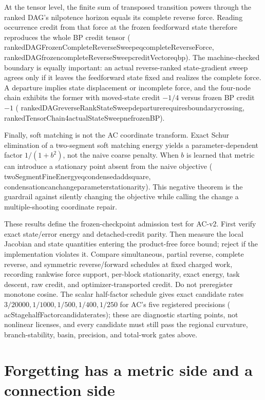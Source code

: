 \documentclass[11pt]{article}
\newcommand{\leanname}[1]{{\scriptsize\ttfamily
  \def\_{\textunderscore\allowbreak}#1}}
\begin{document}
At the tensor level, the finite sum of transposed transition powers through the ranked
DAG's nilpotence horizon equals its complete reverse force.  Reading occurrence credit
from that force at the frozen feedforward state therefore reproduces the whole BP
credit tensor
(\leanname{rankedDAGFrozenCompleteReverseSweep\_eq\_completeReverseForce},
\leanname{rankedDAG\_frozen\_completeReverseSweep\_creditVector\_eq\_bp}).  The
machine-checked boundary is equally important: an actual reverse-ranked state-gradient
sweep agrees only if it leaves the feedforward state fixed and realizes the complete
force.  A departure implies state displacement or incomplete force, and the four-node
chain exhibits the former with moved-state credit $-1/4$ versus frozen BP credit $-1$
(\leanname{rankedDAG\_reverseRankStateSweep\_departure\_requires\_boundary\_crossing},
\leanname{rankedTensorChain4\_actualStateSweep\_ne\_frozenBP}).

Finally, soft matching is not the AC coordinate transform. Exact Schur elimination of a
two-segment soft matching energy yields a parameter-dependent factor $1/(1+b^2)$, not
the naive coarse penalty. When $b$ is learned that metric can introduce a stationary
point absent from the naive objective
(\leanname{twoSegmentFineEnergy\_eq\_condensed\_add\_square},
\leanname{condensation\_can\_change\_parameter\_stationarity}). This negative theorem is
the guardrail against silently changing the objective while calling the change a
multiple-shooting coordinate repair.

These results define the frozen-checkpoint admission test for AC-v2. First verify exact
state/error energy and detached-credit parity. Then measure the local Jacobian and state
quantities entering the product-free force bound; reject if the implementation violates
it. Compare simultaneous, partial reverse, complete reverse, and symmetric
reverse/forward schedules at fixed charged work, recording rankwise force support,
per-block stationarity, exact energy, task descent, raw credit, and optimizer-transported
credit. Do not preregister monotone cosine. The scalar half-factor schedule gives exact
candidate rates $3/20000,1/1000,1/500,1/400,1/250$ for AC's five registered precisions
(\leanname{acStage\_halfFactor\_candidate\_rates}); these are diagnostic starting points,
not nonlinear licenses, and every candidate must still pass the regional curvature,
branch-stability, basin, precision, and total-work gates above.

\section{Forgetting has a metric side and a connection side}
\label{sec:forgetting}
\end{document}
